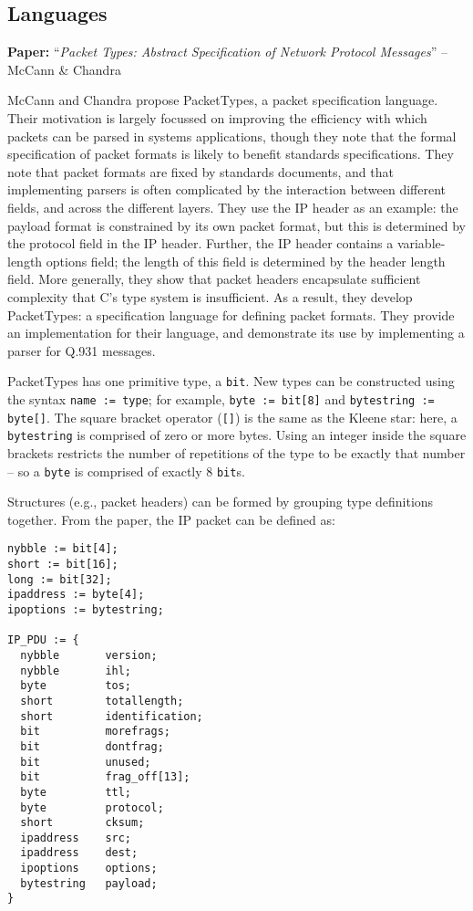 \documentclass[10pt,a4paper]{article}
\newcommand{\paper}[3]{\vspace{4mm}\noindent\textbf{Paper:} ``\textit{#1}'' -- #2 \cite{#3}\vspace{3mm}}
\begin{document}
\subsection{Languages}

\paper{Packet Types: Abstract Specification of Network Protocol Messages}{McCann \& Chandra}{mccann2000packet}

McCann and Chandra propose PacketTypes, a packet specification language. Their motivation
is largely focussed on improving the efficiency with which packets can be parsed in
systems applications, though they note that the formal specification of packet formats is
likely to benefit standards specifications. They note that packet formats are fixed by
standards documents, and that implementing parsers is often complicated by the interaction
between different fields, and across the different layers. They use the IP header as an
example: the payload format is constrained by its own packet format, but this is
determined by the protocol field in the IP header. Further, the IP header contains a
variable-length options field; the length of this field is determined by the header length
field. More generally, they show that packet headers encapsulate sufficient complexity
that C's type system is insufficient. As a result, they develop PacketTypes: a
specification language for defining packet formats. They provide an implementation for
their language, and demonstrate its use by implementing a parser for Q.931 messages. 

PacketTypes has one primitive type, a \texttt{bit}. New types can be constructed using the
syntax \texttt{name := type}; for example, \texttt{byte := bit[8]} and
\texttt{bytestring := byte[]}. The square bracket operator (\texttt{[]}) is the same as
the Kleene star: here, a \texttt{bytestring} is comprised of zero or more bytes. Using
an integer inside the square brackets restricts the number of repetitions of the type to
be exactly that number -- so a \texttt{byte} is comprised of exactly 8 \texttt{bit}s.

Structures (e.g., packet headers) can be formed by grouping type definitions together.
From the paper, the IP packet can be defined as:
\begin{verbatim}
nybble := bit[4];
short := bit[16];
long := bit[32];
ipaddress := byte[4];
ipoptions := bytestring;

IP_PDU := {
  nybble       version;
  nybble       ihl;
  byte         tos;
  short        totallength;
  short        identification;
  bit          morefrags;
  bit          dontfrag;
  bit          unused;
  bit          frag_off[13];
  byte         ttl;
  byte         protocol;
  short        cksum;
  ipaddress    src;
  ipaddress    dest;
  ipoptions    options;
  bytestring   payload;
}
\end{verbatim}
\end{document}
